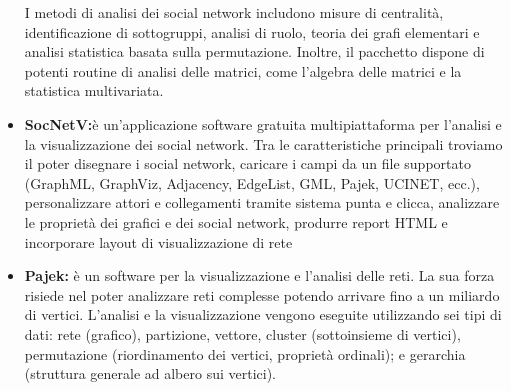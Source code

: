 \documentclass[binding=0.6cm]{sapthesis}
\begin{document}
\begin{itemize}
  I metodi di analisi dei social network includono misure di centralità, identificazione di sottogruppi, analisi di ruolo, teoria dei grafi elementari e analisi statistica basata sulla permutazione. 
  Inoltre, il pacchetto dispone di potenti routine di analisi delle matrici, come l'algebra delle matrici e la statistica multivariata.
  \item \textbf{SocNetV\cite{SocNetV2024}:}è un'applicazione software gratuita multipiattaforma per l'analisi e la visualizzazione dei social network.
  Tra le caratteristiche principali troviamo il poter disegnare i social network, caricare i campi da un file supportato
  (GraphML, GraphViz, Adjacency, EdgeList, GML, Pajek, UCINET, ecc.), personalizzare attori e collegamenti tramite sistema punta e clicca,
  analizzare le proprietà dei grafici e dei social network, produrre report HTML e incorporare layout di visualizzazione di rete
  \item \textbf{Pajek\cite{Pajek2024}:}  è un software per la visualizzazione e l'analisi delle reti. La sua forza risiede nel poter analizzare reti complesse potendo arrivare
  fino a un miliardo di vertici. L'analisi e la visualizzazione vengono eseguite utilizzando sei tipi di dati: 
  rete (grafico), partizione, vettore, cluster (sottoinsieme di vertici), permutazione (riordinamento dei vertici, proprietà ordinali); e gerarchia (struttura generale ad albero sui vertici).
\end{itemize}
\end{document}
